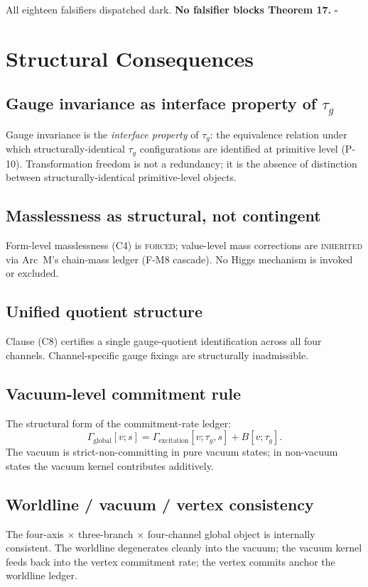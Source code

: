 \documentclass[11pt,a4paper]{article}
\begin{document}
\noindent All eighteen falsifiers dispatched dark. \textbf{No falsifier blocks Theorem 17.} $\square$

\section{Structural Consequences}

\subsection{Gauge invariance as interface property of $\tau_g$}
Gauge invariance is the \emph{interface property} of $\tau_g$: the equivalence relation under which structurally-identical $\tau_g$ configurations are identified at primitive level (P-10). Transformation freedom is not a redundancy; it is the absence of distinction between structurally-identical primitive-level objects.

\subsection{Masslessness as structural, not contingent}
Form-level masslessness (C4) is \textsc{forced}; value-level mass corrections are \textsc{inherited} via Arc~M's chain-mass ledger (F-M8 cascade). No Higgs mechanism is invoked or excluded.

\subsection{Unified quotient structure}
Clause (C8) certifies a single gauge-quotient identification across all four channels. Channel-specific gauge fixings are structurally inadmissible.

\subsection{Vacuum-level commitment rule}
The structural form of the commitment-rate ledger:
\[
\Gamma_{\text{global}}[v;s] = \Gamma_{\text{excitation}}[v;\tau_g,s] + B[v;\tau_g].
\]
The vacuum is strict-non-committing in pure vacuum states; in non-vacuum states the vacuum kernel contributes additively.

\subsection{Worldline / vacuum / vertex consistency}
The four-axis $\times$ three-branch $\times$ four-channel global object is internally consistent. The worldline degenerates cleanly into the vacuum; the vacuum kernel feeds back into the vertex commitment rate; the vertex commits anchor the worldline ledger.
\end{document}
